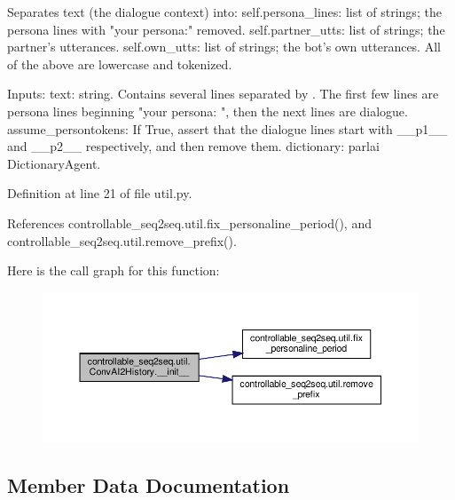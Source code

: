 \begin{DoxyVerb}Separates text (the dialogue context) into:
  self.persona_lines: list of strings; the persona lines with "your persona:"
    removed.
  self.partner_utts: list of strings; the partner's utterances.
  self.own_utts: list of strings; the bot's own utterances.
All of the above are lowercase and tokenized.

Inputs:
  text: string. Contains several lines separated by \n. The first few lines are
    persona lines beginning "your persona: ", then the next lines are dialogue.
  assume_persontokens: If True, assert that the dialogue lines start with
    __p1__ and __p2__ respectively, and then remove them.
  dictionary: parlai DictionaryAgent.
\end{DoxyVerb}
 

Definition at line 21 of file util.\+py.



References controllable\+\_\+seq2seq.\+util.\+fix\+\_\+personaline\+\_\+period(), and controllable\+\_\+seq2seq.\+util.\+remove\+\_\+prefix().

Here is the call graph for this function\+:
\nopagebreak
\begin{figure}[H]
\begin{center}
\leavevmode
\includegraphics[width=350pt]{classcontrollable__seq2seq_1_1util_1_1ConvAI2History_af36e292c392c06ca0d61c29450f09dc0_cgraph}
\end{center}
\end{figure}


\subsection{Member Data Documentation}
\mbox{\label{classcontrollable__seq2seq_1_1util_1_1ConvAI2History_af8973aa261b7a1bac44f999993f8376a}} 
